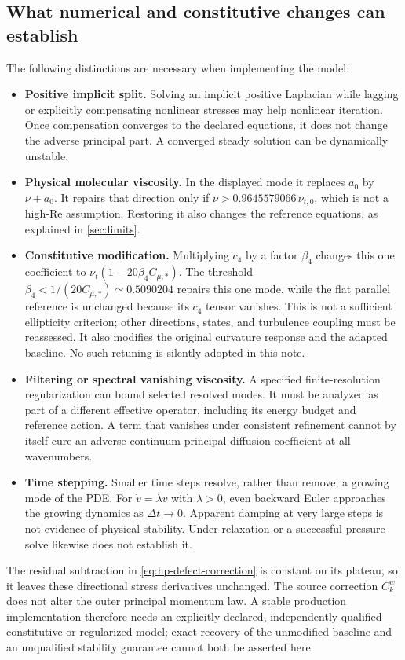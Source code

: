 \documentclass[11pt,a4paper]{article}
\numberwithin{equation}{section}
\newcommand{\Cs}{C_{\mu,*}}
\begin{document}
\subsection{What numerical and constitutive changes can establish}
The following distinctions are necessary when implementing the model:
\begin{itemize}
\item \textbf{Positive implicit split.} Solving an implicit positive
Laplacian while lagging or explicitly compensating nonlinear stresses
may help nonlinear iteration. Once compensation converges to the
declared equations, it does not change the adverse principal part.
A converged steady solution can be dynamically unstable.
\item \textbf{Physical molecular viscosity.} In the displayed mode it
replaces $a_0$ by $\nu+a_0$. It repairs that direction only if
$\nu>0.9645579066\,\nu_{t,0}$, which is not a high-Re assumption.
Restoring it also changes the reference equations, as explained in
\cref{sec:limits}.
\item \textbf{Constitutive modification.} Multiplying $c_4$ by a factor
$\beta_4$ changes this one coefficient to
$\nu_t(1-20\beta_4\Cs)$. The threshold
$\beta_4<1/(20\Cs)\simeq0.5090204$ repairs this one mode, while the
flat parallel reference is unchanged because its $c_4$ tensor vanishes.
This is not a sufficient ellipticity criterion; other directions,
states, and turbulence coupling must be reassessed. It also modifies
the original curvature response and the adapted baseline. No such
retuning is silently adopted in this note.
\item \textbf{Filtering or spectral vanishing viscosity.} A specified
finite-resolution regularization can bound selected resolved modes.
It must be analyzed as part of a different effective operator,
including its energy budget and reference action. A term that vanishes
under consistent refinement cannot by itself cure an adverse
continuum principal diffusion coefficient at all wavenumbers.
\item \textbf{Time stepping.} Smaller time steps resolve, rather than
remove, a growing mode of the PDE. For $\dot v=\lambda v$ with
$\lambda>0$, even backward Euler approaches the growing dynamics as
$\Delta t\to0$. Apparent damping at very large steps is not evidence
of physical stability. Under-relaxation or a successful pressure solve
likewise does not establish it.
\end{itemize}
The residual subtraction in \cref{eq:hp-defect-correction} is constant
on its plateau, so it leaves these directional stress derivatives
unchanged. The source correction $C_k^w$ does not alter the outer
principal momentum law. A stable production implementation therefore
needs an explicitly declared, independently qualified constitutive or
regularized model; exact recovery of the unmodified baseline and an
unqualified stability guarantee cannot both be asserted here.
\end{document}
